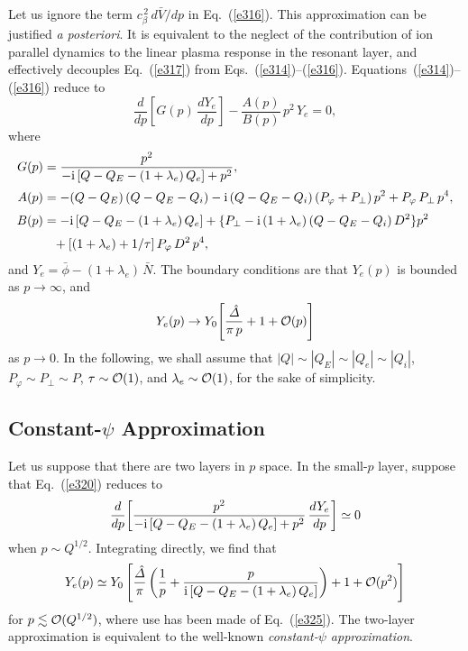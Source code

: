 \documentclass[12pt,prb,aps]{revtex4-1}
\begin{document}
Let us ignore the term $c_\beta^{\,2}\,d\bar{V}/dp$ in Eq.~(\ref{e316}). This approximation can
be justified {\em a posteriori}. It is equivalent to the neglect of the contribution of ion parallel dynamics to the linear  plasma
response in the resonant layer, and effectively decouples Eq.~(\ref{e317}) from Eqs.~(\ref{e314})--(\ref{e316}).\cite{cole,ber} Equations~(\ref{e314})--(\ref{e316}) reduce to\,\cite{cole}
\begin{equation}\label{e320}
\frac{d}{dp}\!\left[G(p)\,\frac{dY_e}{dp}\right] - \frac{A(p)}{B(p)}\,p^{2}\,Y_e = 0,
\end{equation}
where
\begin{align}
G(p)&= \frac{p^2}{-{\rm i}\,[Q-Q_E-(1+\lambda_e)\,Q_e] + p^2},\\[0.5ex]
 A(p) &= -(Q-Q_E)\,(Q-Q_E-Q_i)-{\rm i}\,(Q-Q_E-Q_i)\,(P_\varphi+P_\perp)\,p^2 + P_\varphi\,P_\perp\,p^4,\\[0.5ex]
 B(p) &= 
-{\rm i}\,[Q-Q_E-(1+\lambda_e)\,Q_e] +\{P_\perp - {\rm i}\,(1+\lambda_e)\,(Q-Q_E-Q_i)\,D^2\}p^2\nonumber\\[0.5ex]
&\phantom{=}+[(1+\lambda_e)+1/\tau]\,P_\varphi\,D^2\,p^4,
\end{align}
and $Y_e=\bar{\phi} - (1+\lambda_e)\,\bar{N}$. The boundary conditions are that $Y_e(p)$ is bounded as $p\rightarrow\infty$, and
\begin{equation}\label{e325}
Y_e(p)\rightarrow Y_0\!\left[\frac{\hat{\mit\Delta}}{\pi\,p} + 1+ {\cal O}(p)\right]
\end{equation}
as $p\rightarrow 0$. In the following, we shall assume that $|Q|\sim |Q_E|\sim |Q_e|\sim |Q_i|$, $P_\varphi\sim P_\perp \sim P$, $\tau\sim {\cal O}(1)$, and $\lambda_e\sim{\cal O}(1)$,  for the
sake of simplicity. 

\subsection{Constant-$\psi$ Approximation}\label{s5.6}
Let us suppose that there are two layers in $p$ space. In the small-$p$ layer, suppose that Eq.~(\ref{e320}) reduces to
\begin{equation}
\frac{d}{dp}\!\left[\frac{p^2}{-{\rm i}\,[Q-Q_E-(1+\lambda_e)\,Q_e] + p^2}\,\frac{dY_e}{dp}\right]\simeq 0
\end{equation}
when $p\sim Q^{1/2}$. Integrating directly, we find that
\begin{equation}
Y_e(p) \simeq Y_0 \left[\frac{\hat{\mit\Delta}}{\pi}\left(\frac{1}{p} + \frac{p}{{\rm i}\,[Q-Q_E-(1+\lambda_e)\,Q_e]}\right) + 1 + {\cal O}(p^2)\right]
\end{equation}
for $p\lesssim {\cal O}(Q^{1/2})$, where use has been made of Eq.~(\ref{e325}). The two-layer  approximation is
equivalent to the well-known {\em constant-$\psi$ approximation}.\cite{fkr}
\end{document}
